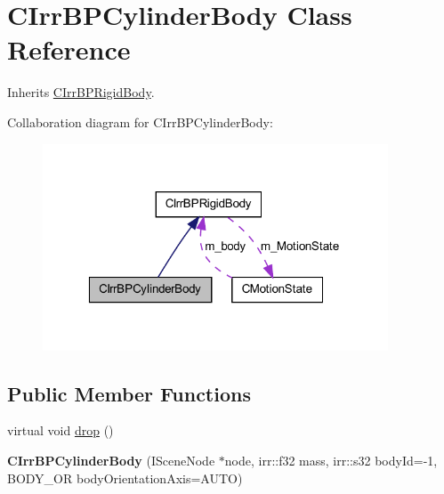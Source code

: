 \hypertarget{class_c_irr_b_p_cylinder_body}{
\section{CIrrBPCylinderBody Class Reference}
\label{class_c_irr_b_p_cylinder_body}
}


Inherits \hyperlink{class_c_irr_b_p_rigid_body}{CIrrBPRigidBody}.



Collaboration diagram for CIrrBPCylinderBody:\nopagebreak
\begin{figure}[H]
\begin{center}
\leavevmode
\includegraphics[width=291pt]{class_c_irr_b_p_cylinder_body__coll__graph}
\end{center}
\end{figure}
\subsection*{Public Member Functions}
\begin{DoxyCompactItemize}
\item 
virtual void \hyperlink{class_c_irr_b_p_cylinder_body_a966bec7330f778f276294601fc7e0c45}{drop} ()
\item 
\hypertarget{class_c_irr_b_p_cylinder_body_a6eb977e0589946de5beb42f4a1c74900}{
{\bfseries CIrrBPCylinderBody} (ISceneNode $\ast$node, irr::f32 mass, irr::s32 bodyId=-\/1, BODY\_\-OR bodyOrientationAxis=AUTO)}
\label{class_c_irr_b_p_cylinder_body_a6eb977e0589946de5beb42f4a1c74900}

\end{DoxyCompactItemize}


